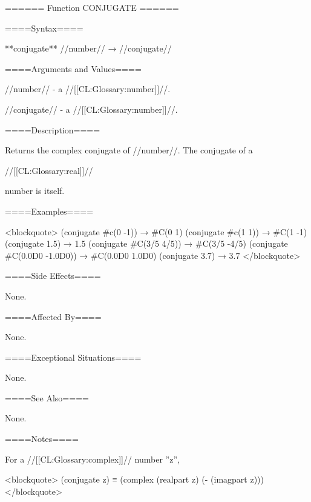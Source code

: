 ====== Function CONJUGATE ======

====Syntax====

**conjugate** //number// → //conjugate//

====Arguments and Values====

//number// - a //[[CL:Glossary:number]]//.

//conjugate// - a //[[CL:Glossary:number]]//.

====Description====

Returns the complex conjugate of //number//. The conjugate of a

//[[CL:Glossary:real]]//

number is itself.

====Examples====

<blockquote> (conjugate #c(0 -1)) → #C(0 1) (conjugate #c(1 1)) → #C(1 -1) (conjugate 1.5) → 1.5 (conjugate #C(3/5 4/5)) → #C(3/5 -4/5) (conjugate #C(0.0D0 -1.0D0)) → #C(0.0D0 1.0D0) (conjugate 3.7) → 3.7 </blockquote>

====Side Effects====

None.

====Affected By====

None.

====Exceptional Situations====

None.

====See Also====

None.

====Notes====

For a //[[CL:Glossary:complex]]// number ''z'',

<blockquote> (conjugate z) ≡ (complex (realpart z) (- (imagpart z))) </blockquote>

